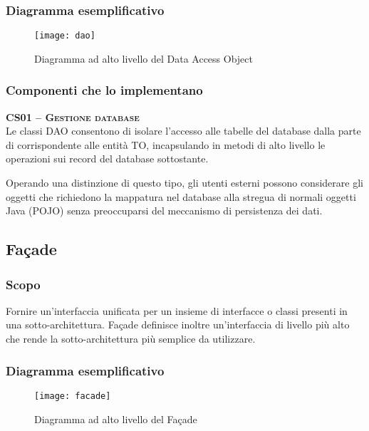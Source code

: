 \subsubsection{Diagramma esemplificativo}
  \begin{figure}[H]
  \centering
  \texttt{[image: dao]}
  \caption{Diagramma ad alto livello del  Data Access Object}\label{fig:dao}
\end{figure}

\subsubsection{Componenti che lo implementano}
\begin{description}
\item{\scshape\bfseries CS01 -- Gestione database}\\
Le classi DAO consentono di isolare l'accesso alle tabelle del database dalla parte di  corrispondente alle entità TO, incapsulando in metodi di alto livello le operazioni sui record del database sottostante.

Operando una distinzione di questo tipo, gli utenti esterni possono considerare gli oggetti che richiedono la mappatura nel database alla stregua di normali oggetti Java (POJO) senza preoccuparsi del meccanismo di persistenza dei dati.
\end{description}

\subsection{Façade}

\subsubsection{Scopo}
Fornire un'interfaccia unificata per un insieme di interfacce o classi presenti in una sotto-architettura. Façade definisce inoltre un'interfaccia di livello più alto che rende la sotto-architettura più semplice da utilizzare.

\subsubsection{Diagramma esemplificativo}
\begin{figure}[H]
  \centering
  \texttt{[image: facade]}
  \caption{Diagramma ad alto livello del  Façade}\label{fig:façade}
\end{figure}


